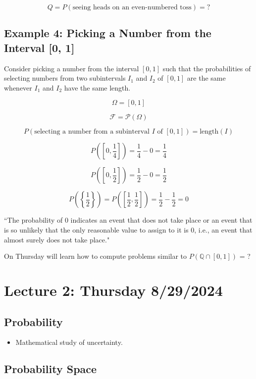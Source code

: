 \documentclass{article}
\begin{document}
\[
Q = P(\text{seeing heads on an even-numbered toss}) = ?
\]

\subsection*{Example 4: Picking a Number from the Interval [0, 1]}
Consider picking a number from the interval \([0, 1]\) such that the probabilities of selecting numbers from two subintervals \(I_1\) and \(I_2\) of \([0, 1]\) are the same whenever \(I_1\) and \(I_2\) have the same length.

\[
\Omega = [0, 1]
\]

\[
\mathcal{F} = \mathcal{P}(\Omega)
\]

\[
P(\text{selecting a number from a subinterval } I \text{ of } [0, 1]) = \text{length}(I)
\]

\[
P([0, \frac{1}{4}]) = \frac{1}{4} - 0 = \frac{1}{4}
\]

\[
P([0, \frac{1}{2}]) = \frac{1}{2} - 0 = \frac{1}{2}
\]

\[
P\left(\left\{\frac{1}{2}\right\}\right) = P\left(\left[\frac{1}{2}, \frac{1}{2}\right]\right) = \frac{1}{2} - \frac{1}{2} = 0
\]

``The probability of 0 indicates an event that does not take place or an event that is so unlikely that the only reasonable value to assign to it is 0, i.e., an event that almost surely does not take place."

On Thursday will learn how to compute problems similar to \(P(\mathbb{Q} \cap [0, 1])\) = ?


\pagebreak

\section*{Lecture 2: Thursday 8/29/2024}

\subsection*{Probability}

\begin{itemize}
    \item Mathematical study of uncertainty.
\end{itemize}

\subsection*{Probability Space}
\end{document}

